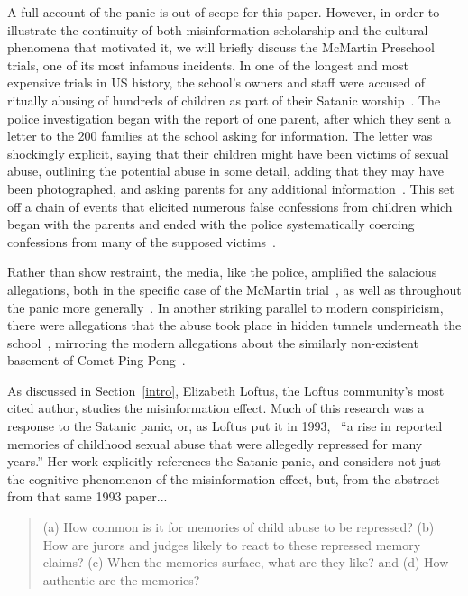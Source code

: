 \documentclass[          
 pre,
 twocolumn,
 twoside,
 superscriptaddress,
 amsmath,
 amssymb,                
 apsf
]{revtex4-2}
\begin{document}
A full account of the panic is out of scope for this paper. However, in order to illustrate the continuity of both misinformation scholarship and the cultural phenomena that motivated it, we will briefly discuss the McMartin Preschool trials, one of its most infamous incidents. In one of the longest and most expensive trials in US history, the school's owners and staff were accused of ritually abusing of hundreds of children as part of their Satanic worship~\cite{Reinhold1990LongestTrial, linderMcMartinPreschoolAbuse2007}. The police investigation began with the report of one parent, after which they sent a letter to the 200 families at the school asking for information. The letter was shockingly explicit, saying that their children might have been victims of sexual abuse, outlining the potential abuse in some detail, adding that they may have been photographed, and asking parents for any additional information~\cite{Reinhold1990LongestTrial}. This set off a chain of events that elicited numerous false confessions from children which began with the parents and ended with the police systematically coercing confessions from many of the supposed victims~\cite{Schreiber2006Suggestive}. 

Rather than show restraint, the media, like the police, amplified the salacious allegations, both in the specific case of the McMartin trial~\cite{shaw2026}, as well as throughout the panic more generally~\cite{SuburbanUncanny2019}. In another striking parallel to modern conspiricism, there were allegations that the abuse took place in hidden tunnels underneath the school~\cite{WildClaimsMass2024}, mirroring the modern allegations about the similarly non-existent basement of Comet Ping Pong~\cite{bentonEverythingOldAgain2025}.

 As discussed in Section~\ref{intro}, Elizabeth Loftus, the Loftus community's most cited author, studies the misinformation effect. Much of this research was a response to the Satanic panic, or, as Loftus put it in 1993,~\cite{loftus_reality_1993} ``a rise in reported memories of childhood sexual abuse that were allegedly repressed for many years.'' Her work explicitly references the Satanic panic, and considers not just the cognitive phenomenon of the misinformation effect, but, from the abstract from that same 1993 paper...

\begin{quote}
    (a) How common is it for memories of child abuse to be repressed? (b) How are jurors and judges likely to react to these repressed memory claims? (c) When the memories surface, what are they like? and (d) How authentic are the memories? 
  \end{quote}
\end{document}
